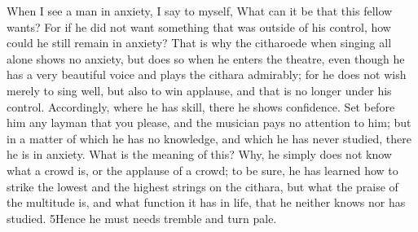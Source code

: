 When I see a man in anxiety, I say to myself, What can it be that this fellow wants? For if he did not want something that was outside of his control, how could he still remain in anxiety? That is why the citharoede when singing all alone shows no anxiety, but does so when he enters the theatre, even though he has a very beautiful voice and plays the cithara admirably; for he does not wish merely to sing well, but also to win applause, and that is no longer under his control. Accordingly, where he has skill, there he shows confidence. Set before him any layman that you please, and the musician pays no attention to him; but in a matter of which he has no knowledge, and which he has never studied, there he is in anxiety. What is the meaning of this? Why, he simply does not know what a crowd is, or the applause of a crowd; to be sure, he has learned how to strike the lowest and the highest strings on the cithara, but what the praise of the multitude is, and what function it has in life, that he neither knows nor has studied. 5Hence he must needs tremble and turn pale.

